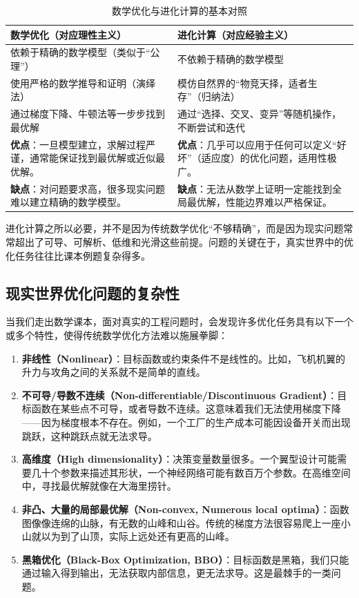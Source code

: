 \documentclass[lang=cn,zihao=-4,a4paper,fontset=windows]{beautybook}
\begin{document}
\begin{table}[H]
\centering
\caption{数学优化与进化计算的基本对照}
\begin{tabular}{p{}p{}}
\toprule
\textbf{数学优化（对应理性主义）} & \textbf{进化计算（对应经验主义）} \\
\midrule
依赖于精确的数学模型（类似于“公理”） & 不依赖于精确的数学模型 \\
\hline
使用严格的数学推导和证明（演绎法） & 模仿自然界的“物竞天择，适者生存”（归纳法） \\
\hline
通过梯度下降、牛顿法等一步步找到最优解 & 通过“选择、交叉、变异”等随机操作，不断尝试和迭代 \\
\hline
\textbf{优点}：一旦模型建立，求解过程严谨，通常能保证找到最优解或近似最优解。 & \textbf{优点}：几乎可以应用于任何可以定义“好坏”（适应度）的优化问题，适用性极广。 \\
\hline
\textbf{缺点}：对问题要求高，很多现实问题难以建立精确的数学模型。 & \textbf{缺点}：无法从数学上证明一定能找到全局最优解，性能边界难以严格保证。 \\
\bottomrule
\end{tabular}
\end{table}

进化计算之所以必要，并不是因为传统数学优化“不够精确”，而是因为现实问题常常超出了可导、可解析、低维和光滑这些前提。问题的关键在于，真实世界中的优化任务往往比课本例题复杂得多。

\subsection{现实世界优化问题的复杂性}

当我们走出数学课本，面对真实的工程问题时，会发现许多优化任务具有以下一个或多个特性，使得传统数学优化方法难以施展拳脚：

\begin{enumerate}
    \item \textbf{非线性（Nonlinear）}：目标函数或约束条件不是线性的。比如，飞机机翼的升力与攻角之间的关系就不是简单的直线。
    \item \textbf{不可导/导数不连续（Non-differentiable/Discontinuous Gradient）}：目标函数在某些点不可导，或者导数不连续。这意味着我们无法使用梯度下降——因为梯度根本不存在。例如，一个工厂的生产成本可能因设备开关而出现跳跃，这种跳跃点就无法求导。
    \item \textbf{高维度（High dimensionality）}：决策变量数量很多。一个翼型设计可能需要几十个参数来描述其形状，一个神经网络可能有数百万个参数。在高维空间中，寻找最优解就像在大海里捞针。
    \item \textbf{非凸、大量的局部最优解（Non-convex, Numerous local optima）}：函数图像像连绵的山脉，有无数的山峰和山谷。传统的梯度方法很容易爬上一座小山就以为到了山顶，实际上远处还有更高的山峰。
    \item \textbf{黑箱优化（Black-Box Optimization, BBO）}：目标函数是黑箱，我们只能通过输入得到输出，无法获取内部信息，更无法求导。这是最棘手的一类问题。
\end{enumerate}
\end{document}
